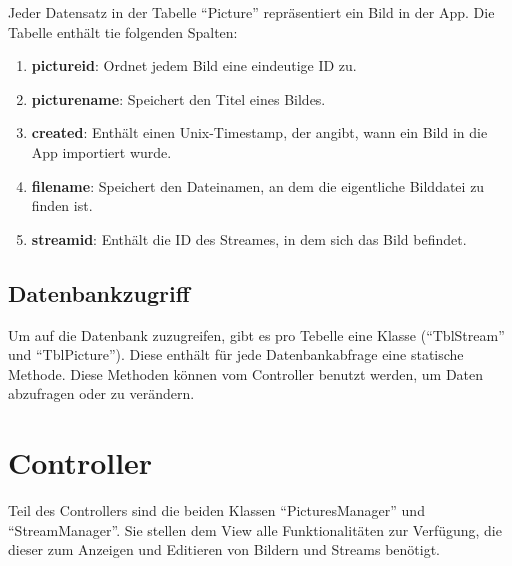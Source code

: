 Jeder Datensatz in der Tabelle \enquote{Picture} repräsentiert ein Bild in der App. Die Tabelle enthält tie folgenden Spalten:
\begin{enumerate}
	\item \textbf{pictureid}: Ordnet jedem Bild eine eindeutige ID zu.
	\item \textbf{picturename}: Speichert den Titel eines Bildes.
	\item \textbf{created}: Enthält einen Unix-Timestamp, der angibt, wann ein Bild in die App importiert wurde.
	\item \textbf{filename}: Speichert den Dateinamen, an dem die eigentliche Bilddatei zu finden ist.
	\item \textbf{streamid}: Enthält die ID des Streames, in dem sich das Bild befindet.
\end{enumerate}

\subsection{Datenbankzugriff}
Um auf die Datenbank zuzugreifen, gibt es pro Tebelle eine Klasse (\enquote{TblStream} und \enquote{TblPicture}). Diese enthält für jede Datenbankabfrage eine statische Methode. Diese Methoden können vom Controller benutzt werden, um Daten abzufragen oder zu verändern.

\section{Controller}

Teil des Controllers sind die beiden Klassen \enquote{PicturesManager} und \enquote{StreamManager}. Sie stellen dem View alle Funktionalitäten zur Verfügung, die dieser zum Anzeigen und Editieren von Bildern und Streams benötigt.


